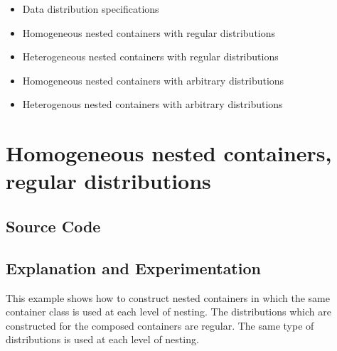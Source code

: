 \documentclass{report}
\begin{document}
\begin{itemize}
\item
Data distribution specifications
\item
Homogeneous nested containers with regular distributions
\item
Heterogeneous nested containers with regular distributions
\item 
Homogeneous nested containers with arbitrary distributions
\item 
Heterogenous nested containers with arbitrary distributions
\end{itemize}


\pagebreak
\section{Homogeneous nested containers, regular distributions}

\subsection{Source Code}



\subsection{Explanation and Experimentation}

This example shows how to construct nested containers in which the same
container class is used at each level of nesting.  The distributions
which are constructed for the composed containers are regular.
The same type of distributions is used at each level of nesting.
\end{document}

